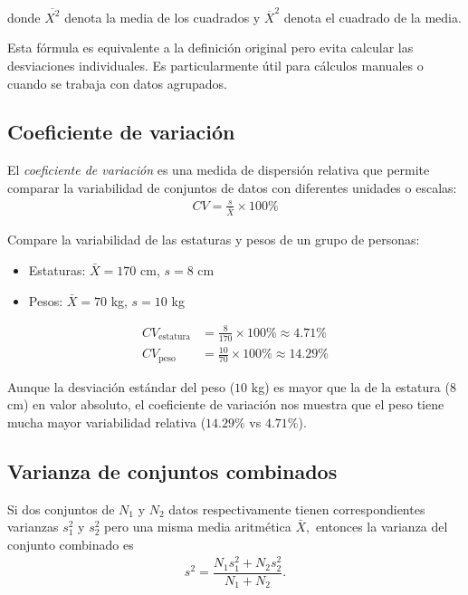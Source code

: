 donde $\overline{X^2}$ denota la media de los cuadrados y $\overline{X}^2$ denota el cuadrado de la media.

\begin{observacion}
	Esta fórmula es equivalente a la definición original pero evita calcular las desviaciones individuales. Es particularmente útil para cálculos manuales o cuando se trabaja con datos agrupados.
\end{observacion}


\subsection{Coeficiente de variación}
El \emph{coeficiente de variación} es una medida de dispersión relativa que permite comparar la variabilidad de conjuntos de datos con diferentes unidades o escalas:
\begin{align}
	CV = \frac{s}{\bar{X}} \times 100\%
\end{align}

\begin{ejemplo}
	Compare la variabilidad de las estaturas y pesos de un grupo de personas:
	\begin{itemize}
		\item Estaturas: $\bar{X} = 170$ cm, $s = 8$ cm
		\item Pesos: $\bar{X} = 70$ kg, $s = 10$ kg
	\end{itemize}
\end{ejemplo}

\begin{solucion}
	\begin{align}
		CV_{\text{estatura}} &= \frac{8}{170} \times 100\% \approx 4.71\% \\
		CV_{\text{peso}} &= \frac{10}{70} \times 100\% \approx 14.29\%
	\end{align}
	
	Aunque la desviación estándar del peso ($10$ kg) es mayor que la de la estatura ($8$ cm) en valor absoluto, el coeficiente de variación nos muestra que el peso tiene mucha mayor variabilidad relativa ($14.29\%$ vs $4.71\%$).
\end{solucion}


\subsection{Varianza de conjuntos combinados}
Si dos conjuntos de $N_{1}$ y $N_{2}$ datos respectivamente tienen correspondientes varianzas $s_{1}^{2}$ y $s_{2}^{2}$ pero una misma media aritmética $\bar{X},$ entonces la varianza del conjunto combinado es
\begin{align}
	s^{2}=\dfrac{N_{1}s_{1}^{2}+N_{2}s_{2}^{2}}{N_{1}+N_{2}}.
\end{align}


